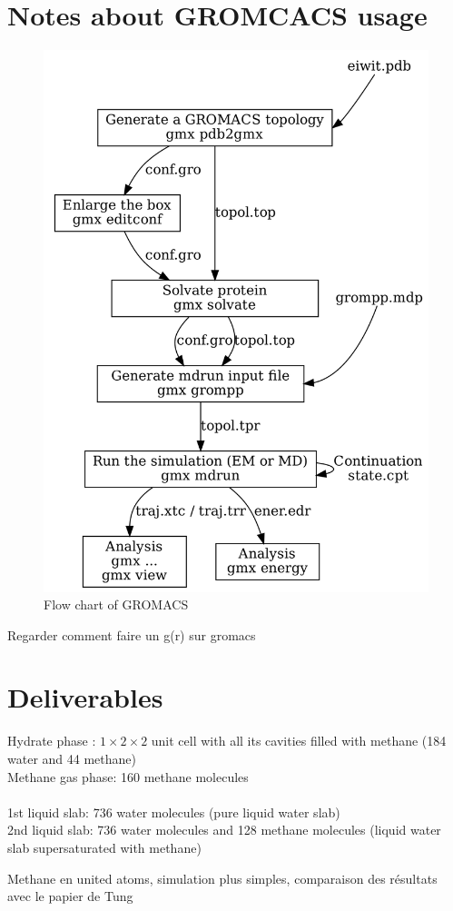 \section{Notes about GROMCACS usage}
\begin{figure}[htbp]
    \centering
    \includegraphics[width=.80\linewidth]{figures/flow-chart.png}
    \caption{Flow chart of GROMACS}
\end{figure}
Regarder comment faire un g(r) sur gromacs

\section{Deliverables}
Hydrate phase : $1 \times 2 \times 2$ unit cell with all its cavities filled with methane (184 water and 44 methane)\\
Methane gas phase: 160 methane molecules\\\\
1st liquid slab: 736 water molecules (pure liquid water slab)\\
2nd liquid slab: 736 water molecules and 128 methane molecules (liquid water slab supersaturated with methane)

Methane en united atoms, simulation plus simples, comparaison des résultats avec le papier de Tung

